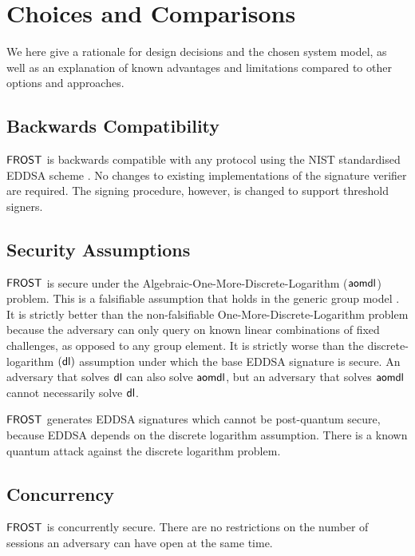 
\section{Choices and Comparisons}\label{section:comparisons}

We here give a rationale for design decisions and the chosen system model, as well as an explanation of known advantages and limitations compared to other options and approaches.


\subsection{Backwards Compatibility}\label{section:comparisons:compatibility}
$\mathsf{FROST}$ is backwards compatible with any protocol using the NIST standardised EDDSA scheme \cite{}.
No changes to existing implementations of the signature verifier are required.
The signing procedure, however, is changed to support threshold signers.

\subsection{Security Assumptions}\label{section:comparisons:security}
$\mathsf{FROST}$ is secure under the Algebraic-One-More-Discrete-Logarithm ($\mathsf{aomdl}$) problem.
This is a falsifiable assumption that holds in the generic group model \cite{}.
It is strictly better than the non-falsifiable One-More-Discrete-Logarithm problem because the adversary can only query on known linear combinations of fixed challenges,
as opposed to any group element.
It is strictly worse than the discrete-logarithm $(\mathsf{dl})$ assumption under which the base EDDSA signature is secure.
An adversary that solves $\mathsf{dl}$ can also solve $\mathsf{aomdl}$, but an adversary that solves $\mathsf{aomdl}$ cannot necessarily solve $\mathsf{dl}$.



$\mathsf{FROST}$ generates EDDSA  signatures which cannot be post-quantum secure, because EDDSA depends on the discrete logarithm assumption.
There is a known quantum attack against the discrete logarithm problem.

\subsection{Concurrency}\label{section:comparisons:concurrency}
$\mathsf{FROST}$ is concurrently secure.  There are no restrictions on the number of sessions an adversary can have open at the same time.

